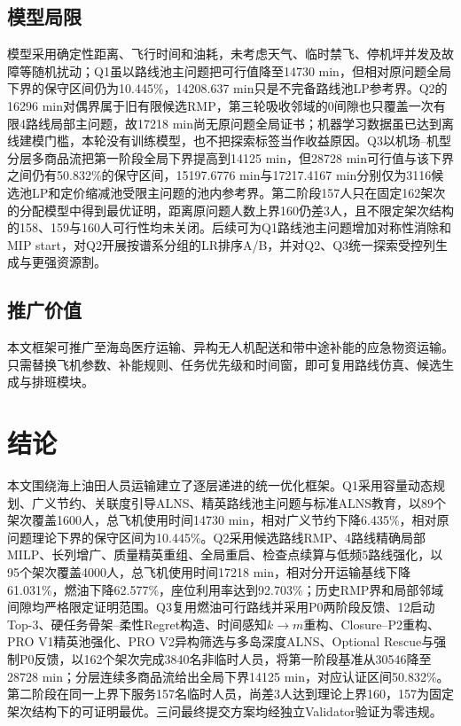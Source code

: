 \documentclass[UTF8,a4paper,zihao=5]{ctexart}
\begin{document}
\subsection{模型局限}
模型采用确定性距离、飞行时间和油耗，未考虑天气、临时禁飞、停机坪并发及故障等随机扰动；Q1虽以路线池主问题把可行值降至14730 min，但相对原问题全局下界的保守区间仍为10.445\%，14208.637 min只是不完备路线池LP参考界。Q2的16296 min对偶界属于旧有限候选RMP，第三轮吸收邻域的0间隙也只覆盖一次有限4路线局部主问题，故17218 min尚无原问题全局证书；机器学习数据虽已达到离线建模门槛，本轮没有训练模型，也不把探索标签当作收益原因。Q3以机场--机型分层多商品流把第一阶段全局下界提高到14125 min，但28728 min可行值与该下界之间仍有50.832\%的保守区间，15197.6776 min与17217.4167 min分别仅为3116候选池LP和定价缩减池受限主问题的池内参考界。第二阶段157人只在固定162架次的分配模型中得到最优证明，距离原问题人数上界160仍差3人，且不限定架次结构的158、159与160人可行性均未关闭。后续可为Q1路线池主问题增加对称性消除和MIP start，对Q2开展按谱系分组的LR排序A/B，并对Q2、Q3统一探索受控列生成与更强资源割。

\subsection{推广价值}
本文框架可推广至海岛医疗运输、异构无人机配送和带中途补能的应急物资运输。只需替换飞机参数、补能规则、任务优先级和时间窗，即可复用路线仿真、候选生成与排班模块。

\section{结论}
本文围绕海上油田人员运输建立了逐层递进的统一优化框架。Q1采用容量动态规划、广义节约、关联度引导ALNS、精英路线池主问题与标准ALNS教育，以89个架次覆盖1600人，总飞机使用时间14730 min，相对广义节约下降6.435\%，相对原问题理论下界的保守区间为10.445\%。Q2采用候选路线RMP、4路线精确局部MILP、长列增广、质量精英重组、全局重启、检查点续算与低频5路线强化，以95个架次覆盖4000人，总飞机使用时间17218 min，相对分开运输基线下降61.031\%，燃油下降62.577\%，座位利用率达到92.703\%；历史RMP界和局部邻域间隙均严格限定证明范围。Q3复用燃油可行路线并采用P0两阶段反馈、12启动Top-$3$、硬任务骨架--柔性Regret构造、时间感知$k\to m$重构、Closure--P2重构、PRO V1精英池强化、PRO V2异构筛选与多岛深度ALNS、Optional Rescue与强制P0反馈，以162个架次完成3840名非临时人员，将第一阶段基准从30546降至28728 min；分层连续多商品流给出全局下界14125 min，对应认证区间50.832\%。第二阶段在同一上界下服务157名临时人员，尚差3人达到理论上界160，157为固定架次结构下的可证明最优。三问最终提交方案均经独立Validator验证为零违规。
\end{document}
